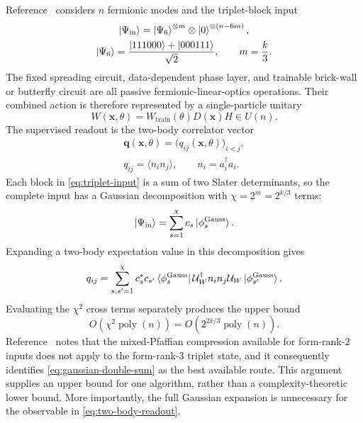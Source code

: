 \documentclass[10pt,twocolumn]{article}
\theoremstyle{plain}
\begin{document}
Reference~\cite{Kerenidis2026v1} considers \(n\) fermionic modes and
the triplet-block input
\begin{equation}
\begin{gathered}
\ket{\Psi_{\mathrm{in}}}
=
\ket{\Psi_6}^{\otimes m}
\otimes
\ket{0}^{\otimes(n-6m)},
\\
\ket{\Psi_6}
=
\frac{\ket{111000}+\ket{000111}}{\sqrt{2}},
\qquad
m=\frac{k}{3}.
\end{gathered}
\label{eq:triplet-input}
\end{equation}
The fixed spreading circuit, data-dependent phase layer, and trainable
brick-wall or butterfly circuit are all passive fermionic-linear-optics
operations. Their combined action is therefore represented by a
single-particle unitary
\begin{equation}
W(\mathbf{x},\theta)
=
W_{\mathrm{train}}(\theta)D(\mathbf{x})H\in U(n).
\label{eq:total-single-particle-unitary}
\end{equation}
The supervised readout is the two-body correlator vector
\begin{equation}
\begin{gathered}
\mathbf q(\mathbf{x},\theta)
=
\bigl(q_{ij}(\mathbf{x},\theta)\bigr)_{i<j},
\\
q_{ij}
=
\langle n_i n_j\rangle,
\qquad
n_i=a_i^\dagger a_i.
\end{gathered}
\label{eq:two-body-readout}
\end{equation}
Each block in \eqref{eq:triplet-input} is a sum of two Slater
determinants, so the complete input has a Gaussian decomposition with
\(\chi=2^m=2^{k/3}\) terms:
\[
\ket{\Psi_{\mathrm{in}}}
=
\sum_{s=1}^{\chi}
c_s\ket{\phi_s^{\mathrm{Gauss}}}.
\]
Expanding a two-body expectation value in this decomposition gives
\begin{equation}
q_{ij}
=
\sum_{s,s'=1}^{\chi}
c_s^\ast c_{s'}
\bra{\phi_s^{\mathrm{Gauss}}}
\mathcal U_W^\dagger n_i n_j\mathcal U_W
\ket{\phi_{s'}^{\mathrm{Gauss}}}.
\label{eq:gaussian-double-sum}
\end{equation}
Evaluating the \(\chi^2\) cross terms separately produces the upper
bound
\[
O\!\left(
\chi^2\operatorname{poly}(n)
\right)
=
O\!\left(
2^{2k/3}\operatorname{poly}(n)
\right).
\]
Reference~\cite{Kerenidis2026v1} notes that the mixed-Pfaffian
compression available for form-rank-\(2\) inputs does not apply to the
form-rank-\(3\) triplet state, and it consequently identifies
\eqref{eq:gaussian-double-sum} as the best available route. This
argument supplies an upper bound for one algorithm, rather than a
complexity-theoretic lower bound. More importantly, the full Gaussian
expansion is unnecessary for the observable in
\eqref{eq:two-body-readout}.
\end{document}
